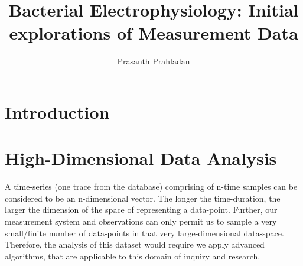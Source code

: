 \documentclass[10pt]{article}
\begin{document}
                                       
\title{Bacterial Electrophysiology: Initial explorations of Measurement Data}
\author{Prasanth Prahladan}
\maketitle

\section{Introduction}


\section{High-Dimensional Data Analysis}

A time-series (one trace from the database) comprising of n-time samples can be considered to be an n-dimensional vector. The longer the time-duration, the larger the dimension of the space of representing a data-point. Further, our measurement system and observations can only permit us to sample a very small/finite number of data-points in that very large-dimensional data-space. Therefore, the analysis of this dataset would require we apply advanced algorithms, that are applicable to this domain of inquiry and research. 
\end{document}
